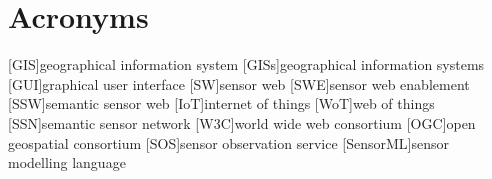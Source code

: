 
\chapter*{Acronyms}

\begin{acronym}[UML]
  [GIS]{geographical information system}
  [GISs]{geographical information systems}
  [GUI]{graphical user interface}
  [SW]{sensor web}
  [SWE]{sensor web enablement}
  [SSW]{semantic sensor web}
  [IoT]{internet of things}
  [WoT]{web of things}
  [SSN]{semantic sensor network}
  [W3C]{world wide web consortium}
  [OGC]{open geospatial consortium}
  [SOS]{sensor observation service}
  [SensorML]{sensor modelling language}
\end{acronym}